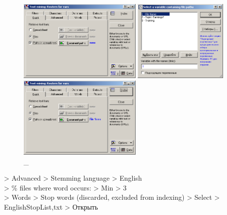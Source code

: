 \begin{figure}[!h]
  \centering

  \begin{minipage}{0.32\textwidth}
    \centering

    \includegraphics[height=4cm]
    {inc/var5/2.PNG}

    \caption{\_}

    \label{fig:var5_2}
  \end{minipage}
  \begin{minipage}{0.32\textwidth}
    \centering

    \includegraphics[height=4cm]
    {inc/var5/3.PNG}

    \caption{\_}

    \label{fig:var5_3}
  \end{minipage}
  \begin{minipage}{0.32\textwidth}
    \centering

    \includegraphics[height=4cm]
    {inc/var5/4.PNG}

    \caption{\_}

    \label{fig:var5_4}
  \end{minipage}
\end{figure}


> Advanced > Stemming language > English \\
> \% files where word occurs: > Min > 3 \\
> Words > Stop words (discarded, excluded from indexing) > Select > EnglishStopList,txt > Открыть \\

